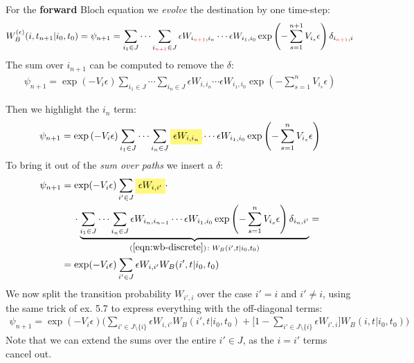 \documentclass[../template.tex]{subfiles}
\begin{document}
\begin{exo}
    \medskip

    For the \textbf{forward} Bloch equation we \textit{evolve} the destination by one time-step:
    \begin{align*}
        W_B^{(\epsilon)}(i,t_{n+1}|i_0,t_0) = \psi_{n+1} = \sum_{i_1 \in J} \cdots \sum_{i_{\textcolor{Red}{n+1}} \in J} \epsilon W_{i_{\textcolor{Red}{n+1}},i_n} \cdots   \epsilon W_{i_1,i_0}  \exp\left(-\sum_{s=1}^{n+1} V_{i_s}\epsilon\right) \delta_{i_{\textcolor{Red}{n+1}},i} 
    \end{align*}  
    The sum over $i_{n+1}$ can be computed to remove the $\delta$:
    \begin{align*}
        \psi_{n+1} =\exp\left(-V_{i} \epsilon\right) \sum_{i_1 \in J} \cdots \sum_{i_n \in J} \epsilon W_{i,i_n} \cdots \epsilon W_{i_1,i_0}  \exp\left(-\sum_{s=1}^{n} V_{i_s} \epsilon\right) 
    \end{align*}

    Then we highlight the $i_n$ term:
    \begin{align*}
        \psi_{n+1} =\exp\left(-V_{i} \epsilon\right) \sum_{i_1 \in J} \cdots \sum_{i_{{n}} \in J} \hlc{Yellow}{\epsilon W_{i,i_n} }\cdots \epsilon W_{i_1,i_0}   \exp\left(-\sum_{s=1}^{n} V_{i_s} \epsilon\right) 
    \end{align*}
    To bring it out of the \textit{sum over paths} we insert a $\delta$:
    \begin{align*}
        \psi_{n+1} &= \exp(-V_{i} \epsilon) \sum_{i' \in J}   \hlc{Yellow}{\epsilon W_{i,i'}} \cdot \\
        &\quad\>\cdot \underbrace{\sum_{i_1 \in J} \cdots \sum_{i_n \in J} \epsilon W_{i_n,i_{n-1}} \cdots \epsilon W_{i_1,i_0}   \exp\left(-\sum_{s=1}^{n} V_{i_s} \epsilon\right) \delta_{i_n,i'}}_{(\ref{eqn:wb-discrete})\colon W_B(i',t|i_0,t_0)} =\\
        &=\exp(-V_i \epsilon)  \sum_{i' \in J} \epsilon W_{i,i'} W_B(i',t|i_0,t_0)
    \end{align*} 
    We now split the transition probability $W_{i',i}$ over the case $i' = i$ and $i' \neq i$, using the same trick of ex. 5.7 to express everything with the off-diagonal terms:
    \begin{align*}
        \psi_{n+1} = \exp(-V_i \epsilon) \Big(\sum_{i' \in J\setminus \{i\}} \epsilon W_{i,i'} W_B(i',t|i_0,t_0) + \Big[1-\sum_{i' \in J \setminus \{i\}}\epsilon W_{i',i}\Big] W_B(i,t|i_0,t_0)\Big)
    \end{align*}
    Note that we can extend the sums over the entire $i' \in J$, as the $i=i'$ terms cancel out.


\end{exo}
\end{document}
